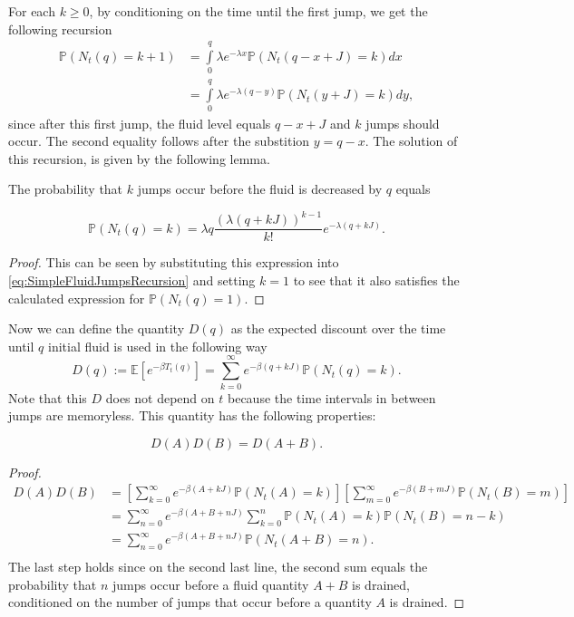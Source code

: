For each $k\geq0$, by conditioning on the time until the first jump, we get the following recursion
\begin{equation}\label{eq:SimpleFluidJumpsRecursion}
\begin{split}
\mathbb{P}(N_t(q)=k+1)&=\int\limits_0^{q}\lambda e^{-\lambda x}\mathbb{P}(N_t(q-x+J)=k)dx\\
&=\int\limits_0^{q}\lambda e^{-\lambda (q-y)}\mathbb{P}(N_t(y+J)=k)dy,
\end{split}
\end{equation}
since after this first jump, the fluid level equals $q-x+J$ and $k$ jumps should occur. The second equality follows after the substition $y=q-x$.
The solution of this recursion, is given by the following lemma.
\begin{lemma}
	The probability that $k$ jumps occur before the fluid is decreased by $q$ equals
	
	\[\mathbb{P}(N_t(q)=k)=\lambda q\frac{(\lambda (q+kJ))^{k-1}}{k!}e^{-\lambda(q+kJ)}.\]
	
	\begin{proof}
		This can be seen by substituting this expression into \eqref{eq:SimpleFluidJumpsRecursion} and setting $k=1$ to see that it also satisfies the calculated expression for $\mathbb{P}(N_t(q)=1)$.
	\end{proof}
\end{lemma}

Now we can define the quantity $D(q)$ as the expected discount over the time until $q$ initial fluid is used in the following way
\begin{equation}\label{eq:SimpleFluidDiscountDefinition}
D(q):=\mathbb{E}[e^{-\beta T_t(q)}]=\sum\limits_{k=0}^\infty e^{-\beta(q+kJ)}\mathbb{P}(N_t(q)=k).
\end{equation}
Note that this $D$ does not depend on $t$ because the time intervals in between jumps are memoryless.
This quantity has the following properties:
\begin{lemma}\label{lemma:SimpleFluidDiscountLogLinear}
	\[D(A)D(B)=D(A+B).\]
	\begin{proof}
		\begin{equation}
		\begin{split}
		D(A)D(B)&=\left[\sum\limits_{k=0}^\infty e^{-\beta(A+kJ)}\mathbb{P}(N_t(A)=k)\right]\left[\sum\limits_{m=0}^\infty e^{-\beta(B+mJ)}\mathbb{P}(N_t(B)=m)\right]\\
		&=\sum\limits_{n=0}^\infty e^{-\beta(A+B+nJ)}\sum\limits_{k=0}^n \mathbb{P}(N_t(A)=k)\mathbb{P}(N_t(B)=n-k)\\
		&=\sum\limits_{n=0}^\infty e^{-\beta(A+B+nJ)} \mathbb{P}(N_t(A+B)=n).\\
		\end{split}
		\end{equation}
		The last step holds since on the second last line, the second sum equals the probability that $n$ jumps occur before a fluid quantity $A+B$ is drained, conditioned on the number of jumps that occur before a quantity $A$ is drained.
	\end{proof}
\end{lemma}

